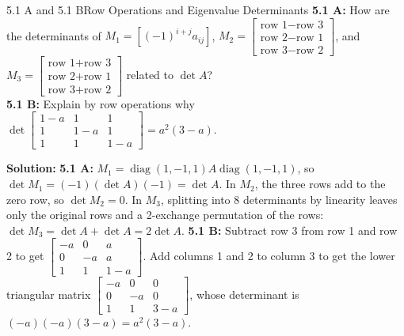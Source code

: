 \documentclass[11pt,a4paper,openany,oneside]{book}
\numberwithin{equation}{chapter}
\begin{document}
\begin{example}{5.1 A and 5.1 B}{Row Operations and Eigenvalue Determinants}
\textbf{5.1 A:} How are the determinants of $M_1 = [(-1)^{i+j}a_{ij}]$, $M_2 = \begin{bmatrix}\text{row 1}-\text{row 3}\\\text{row 2}-\text{row 1}\\\text{row 3}-\text{row 2}\end{bmatrix}$, and $M_3 = \begin{bmatrix}\text{row 1}+\text{row 3}\\\text{row 2}+\text{row 1}\\\text{row 3}+\text{row 2}\end{bmatrix}$ related to $\det A$?\\
\textbf{5.1 B:} Explain by row operations why $\det\begin{bmatrix}1-a & 1 & 1\\1 & 1-a & 1\\1 & 1 & 1-a\end{bmatrix} = a^2(3-a)$.
\end{example}
\textbf{Solution:}
\textbf{5.1 A:} $M_1 = \operatorname{diag}(1,-1,1)A\operatorname{diag}(1,-1,1)$, so $\det M_1 = (-1)(\det A)(-1) = \det A$. In $M_2$, the three rows add to the zero row, so $\det M_2 = 0$. In $M_3$, splitting into 8 determinants by linearity leaves only the original rows and a 2-exchange permutation of the rows: $\det M_3 = \det A + \det A = 2\det A$.
\textbf{5.1 B:} Subtract row 3 from row 1 and row 2 to get $\begin{bmatrix}-a & 0 & a\\0 & -a & a\\1 & 1 & 1-a\end{bmatrix}$. Add columns 1 and 2 to column 3 to get the lower triangular matrix $\begin{bmatrix}-a & 0 & 0\\0 & -a & 0\\1 & 1 & 3-a\end{bmatrix}$, whose determinant is $(-a)(-a)(3-a) = a^2(3-a)$.
\end{document}
